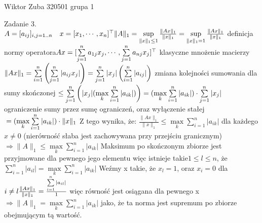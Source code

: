 \documentclass{article}
\begin{document}
 
Wiktor Zuba 320501 grupa 1
\newline

Zadanie 3.
\newline
$
A=[a_{ij}]_{i,j=1..n}\quad x=[x_1,\cdots,x_n]^{\top}\newline
\lVert A\rVert_1=\sup\limits_{\lVert x\rVert_1\le1}\frac{\lVert Ax\rVert_1}{\lVert x\rVert_1}=
\sup\limits_{\lVert x\rVert_1=1}\frac{\lVert Ax\rVert_1}{\lVert x\rVert_1}$ definicja normy operatora$\newline
Ax=[\sum\limits_{j=1}^{n}a_{1j}x_j,\cdots,\sum\limits_{j=1}^{n}a_{nj}x_j]^{\top}$ klasyczne mnożenie macierzy$\newline
\lVert Ax\rVert_1=\sum\limits_{i=1}^{n}\left(\sum\limits_{j=1}^{n}|a_{ij}x_j|\right)=\sum\limits_{j=1}^{n}|x_j|\left(\sum\limits_{i=1}^{n}|a_{ij}|\right)
$ zmiana kolejności sumowania dla sumy skończonej$\newline
\le\sum\limits_{j=1}^{n}\left(|x_j|(\max\limits_{k}\sum\limits_{i=1}^{n}|a_{ik}|)\right)=
(\max\limits_{k}\sum\limits_{i=1}^{n}|a_{ik}|)\cdot\sum\limits_{j=1}^{n}|x_j|$ ograniczenie sumy przez sumę ograniczeń, oraz wyłączenie stałej$\newline
=(\max\limits_{k}\sum\limits_{i=1}^{n}|a_{ik}|)\cdot\lVert x\rVert_1\newline
$
Z tego wynika, że:
$
\frac{\lVert Ax\rVert_1}{\lVert x\rVert_1}\le\max\limits_{k}\sum\limits_{i=1}^{n}|a_{ik}|
$ dla każdego $x\neq0$ (nierówność słaba jest zachowywana przy przejściu granicznym)
$\Rightarrow \lVert A\rVert_1\le\max\limits_{k}\sum\limits_{i=1}^{n}|a_{ik}|$\newline
Maksimum po skończonym zbiorze jest przyjmowane dla pewnego jego elementu więc istnieje takie\newline $1\le l\le n$, że
$\sum\limits_{i=1}^{n}|a_{il}|=\max\limits_{k}\sum\limits_{i=1}^{n}|a_{ik}|$\newline
Weźmy x takie, że $x_l=1$, oraz $x_i=0$ dla $i\neq l\newline
\frac{\lVert Ax\rVert_1}{\lVert x\rVert_1}=\frac{\sum\limits_{i=1}^{n}|a_{il}|}{1}$
więc równość jest osiągana dla pewnego x $\Rightarrow \lVert A\rVert_1=\max\limits_{k}\sum\limits_{i=1}^{n}|a_{ik}|$
jako, że ta norma jest supremum po zbiorze obejmującym tą wartość.
\end{document}
